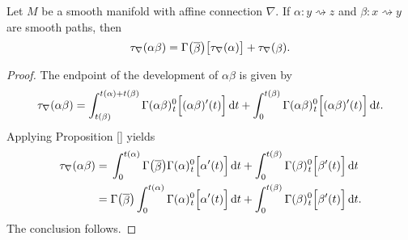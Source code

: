 \begin{proposition}
  Let $M$ be a smooth manifold with affine connection $\nabla$. If $\alpha \colon y \rightsquigarrow z$ and $\beta \colon x \rightsquigarrow y$ are smooth paths, then
  \begin{equation}
    \tau_\nabla (\alpha \beta) = \Gamma\big(\raisebox{-1pt}{$\overline{\beta}$}\big) \big[ \tau_\nabla (\alpha) \big] + \tau_\nabla(\raisebox{-1pt}{$\beta$}). 
  \end{equation}
\end{proposition}
\begin{proof}
  The endpoint of the development of $\alpha \beta$ is given by
  \begin{equation}
    \tau_\nabla(\alpha\beta) = \int_{t(\beta)}^{t(\alpha) + t(\beta)} \Gamma(\alpha \beta)_{\hspace{0.5pt}t}^0 \Big[ (\alpha \beta)'(t)\Big] \, {\rm d} t  + \int_{0}^{t(\beta)} \Gamma(\alpha \beta)_{\hspace{0.5pt}t}^0 \Big[ (\alpha \beta)'(t)\Big] \, {\rm d} t.
  \end{equation}
  Applying Proposition \ref{} yields
  \begin{align}
    \tau_\nabla(\alpha\beta) &= \,\int_{0}^{t(\alpha)} \Gamma\big(\raisebox{-1pt}{$\overline{\beta}$}\big)\Gamma(\alpha)_{\hspace{0.5pt}t}^0 \Big[ \alpha'(t)\Big] \, \d t + \int_{0}^{t(\beta)} \Gamma(\beta)_{\hspace{0.5pt}t}^0 \Big[ \beta'(t)\Big] \, \d t \\
    &= \Gamma\big(\raisebox{-1pt}{$\overline{\beta}$}\big) \int_{0}^{t(\alpha)} \Gamma(\alpha)_{\hspace{0.5pt}t}^0 \Big[ \alpha'(t)\Big] \, \d t + \int_{0}^{t(\beta)} \Gamma(\beta)_{\hspace{0.5pt}t}^0 \Big[ \beta'(t)\Big] \, \d t.
  \end{align}
  The conclusion follows.
\end{proof}

